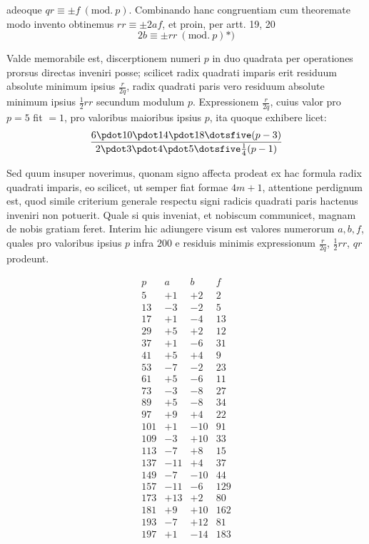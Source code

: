 %
adeoque $qr\equiv\pm f\ (\mathrm{mod.}\ p)$. Combinando hanc congruentiam cum theoremate modo invento obtinemus $rr\equiv\pm2af$, et proin, per artt. 19, 20
\[
2b\equiv\pm rr\ (\mathrm{mod.}\ p)\text{*)}
\]
\begingroup\renewcommand{\thefootnote}{*)}\endgroup

Valde memorabile est, discerptionem numeri $p$ in duo quadrata per operationes prorsus directas inveniri posse; scilicet radix quadrati imparis erit residuum absolute minimum ipsius $\frac r{2q}$, radix quadrati paris vero residuum absolute minimum ipsius $\frac12rr$ secundum modulum $p$. Expressionem $\frac r{2q}$, cuius valor pro $p=5$ fit $=1$, pro valoribus maioribus ipsius $p$, ita quoque exhibere licet:
\[
\frac{6\pdot10\pdot14\pdot18\dotsfive(p-3)}{2\pdot3\pdot4\pdot5\dotsfive\frac14(p-1)}
\]

Sed quum insuper noverimus, quonam signo affecta prodeat ex hac formula radix quadrati imparis, eo scilicet, ut semper fiat formae $4m+1$, attentione perdignum est, quod simile criterium generale respectu signi radicis quadrati paris hactenus inveniri non potuerit. Quale si quis inveniat, et nobiscum communicet, magnam de nobis gratiam feret. Interim hic adiungere visum est valores numerorum $a,b,f$, quales pro valoribus ipsius $p$ infra $200$ e residuis minimis expressionum $\frac r{2q}$, $\frac12rr$, $qr$ prodeunt.

%
\[
\begin{array}{r|r|r|r}
p&a&b&f\\\hline
5&+1&+2&2\\
13&-3&-2&5\\
17&+1&-4&13\\
29&+5&+2&12\\
37&+1&-6&31\\
41&+5&+4&9\\
53&-7&-2&23\\
61&+5&-6&11\\
73&-3&-8&27\\
89&+5&-8&34\\
97&+9&+4&22\\
101&+1&-10&91\\
109&-3&+10&33\\
113&-7&+8&15\\
137&-11&+4&37\\
149&-7&-10&44\\
157&-11&-6&129\\
173&+13&+2&80\\
181&+9&+10&162\\
193&-7&+12&81\\
197&+1&-14&183
\end{array}
\]

